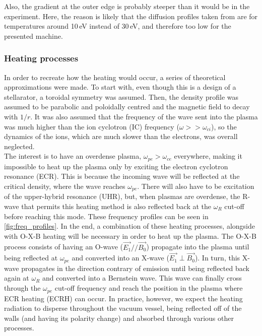 \par Also, the gradient at the outer edge is probably steeper than it would be in the experiment. Here, the reason is likely that the diffusion profiles taken from \cite{birkenmaierModeling2008} are for temperatures around 10\,eV instead of 30\,eV, and therefore too low for the presented machine.

\subsubsection{Heating processes}  %
In order to recreate how the heating would occur, a series of theoretical approximations were made.
To start with, even though this is a design of a stellarator, a toroidal symmetry was assumed.
Then, the density profile was assumed to be parabolic and poloidally centred and the magnetic field to decay with $1/r$.
It was also assumed that the frequency of the wave sent into the plasma was much higher than the ion cyclotron (IC) frequency ($\omega >> \omega_{ci}$), so the dynamics of the ions, which are much slower than the electrons, was overall neglected. \\

The interest is to have an overdense plasma, $\omega_{pe} > \omega_{ce}$ everywhere, making it impossible to heat up the plasma only by exciting the electron cyclotron resonance (ECR).
This is because the incoming wave will be reflected at the critical density, where the wave reaches $\omega_{pe}$.
There will also have to be excitation of the upper-hybrid resonance (UHR), but, when plasmas are overdense, the R-wave that permits this heating method is also reflected back at the $\omega_R$ cut-off before reaching this mode.
These frequency profiles can be seen in \autoref{fig:freq_profiles}.
In the end, a combination of these heating processes, alongside with O-X-B heating will be necessary in order to heat up the plasma.
The O-X-B process consists of having an O-wave ($\overrightarrow{E_1} // \overrightarrow{B_0}$) propagate into the plasma until being reflected at $\omega_{pe}$ and converted into an X-wave ($\overrightarrow{E_1} \perp \overrightarrow{B_0}$).
In turn, this X-wave propagates in the direction contrary of emission until being reflected back again at $\omega_R$ and converted into a Bernstein wave.   
This wave can finally cross through the $\omega_{pe}$ cut-off frequency and reach the position in the plasma where ECR heating (ECRH) can occur.
In practice, however, we expect the heating radiation to disperse throughout the vacuum vessel, being reflected off of the walls (and having its polarity change) and absorbed through various other processes.

